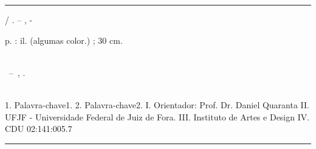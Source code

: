 \documentclass[
	12pt,				%
	openright,			%
	twoside,			%
	a4paper,			%
	english,			%
	french,				%
	spanish,			%
	brazil				%
	]{abntex2}
\begin{document}
\frenchspacing 


\imprimircapa

\imprimirfolhaderosto*


%
%     
\begin{fichacatalografica}
	\vspace*{\fill}					%
	\hrule							%
	\begin{center}					%
	\begin{minipage}[c]{12.5cm}		%
	
	\imprimirautor
	
	\hspace{0.5cm} \imprimirtitulo  / \imprimirautor. --
	\imprimirlocal, \imprimirdata-
	
	\hspace{0.5cm} \pageref{LastPage} p. : il. (algumas color.) ; 30 cm.\\
	
	\hspace{0.5cm} \imprimirorientadorRotulo~\imprimirorientador\\
	
	\hspace{0.5cm}
	\parbox[t]{\textwidth}{\imprimirtipotrabalho~--~\imprimirinstituicao,
	\imprimirdata.}\\
	
	\hspace{0.5cm}
		1. Palavra-chave1.
		2. Palavra-chave2.
		I. Orientador: Prof. Dr. Daniel Quaranta
		II. UFJF - Universidade Federal de Juiz de Fora.
		III. Instituto de Artes e Design
		IV. \imprimirtitulo \\ 			
	
	\hspace{8.75cm} CDU 02:141:005.7\\
	
	\end{minipage}
	\end{center}
	\hrule
\end{fichacatalografica}
\end{document}
